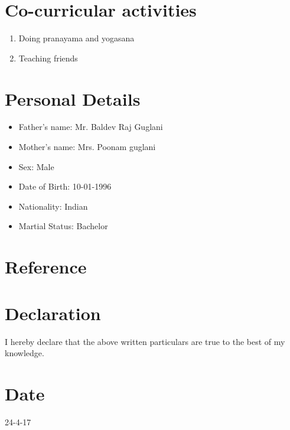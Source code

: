 \documentclass[11pt]{article}
\begin{document}
\section*{Co-curricular activities}  
\begin{enumerate}
	\item Doing pranayama and yogasana
	\item Teaching friends
\end{enumerate}
\section*{Personal Details}  
\begin{itemize}
	\item Father's name: Mr. Baldev Raj Guglani
	\item Mother's name: Mrs. Poonam guglani
	\item Sex: Male
	\item Date of Birth: 10-01-1996
	\item Nationality: Indian
	\item Martial Status: Bachelor
\end{itemize}
\section*{Reference}
\section*{Declaration} 
I hereby declare that the above written particulars are true to the best of my knowledge.
\section*{Date} 
24-4-17
\end{document}
